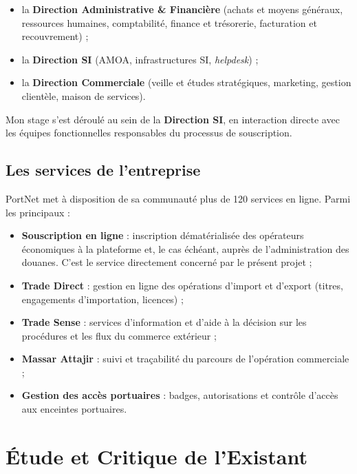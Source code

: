 \begin{itemize}[leftmargin=1.6cm,itemsep=2pt,topsep=4pt]
  \item la \textbf{Direction Administrative \& Financière} (achats et moyens
        généraux, ressources humaines, comptabilité, finance et trésorerie,
        facturation et recouvrement) ;
  \item la \textbf{Direction SI} (AMOA, infrastructures SI, \textit{helpdesk}) ;
  \item la \textbf{Direction Commerciale} (veille et études stratégiques,
        marketing, gestion clientèle, maison de services).
\end{itemize}

Mon stage s'est déroulé au sein de la \textbf{Direction SI}, en interaction
directe avec les équipes fonctionnelles responsables du processus de souscription.

\subsection{Les services de l'entreprise}

PortNet met à disposition de sa communauté plus de 120 services en ligne. Parmi
les principaux :

\begin{itemize}[leftmargin=1.6cm,itemsep=3pt,topsep=4pt]
  \item \textbf{Souscription en ligne} : inscription dématérialisée des opérateurs
        économiques à la plateforme et, le cas échéant, auprès de l'administration
        des douanes. C'est le service directement concerné par le présent projet ;
  \item \textbf{Trade Direct} : gestion en ligne des opérations d'import et
        d'export (titres, engagements d'importation, licences) ;
  \item \textbf{Trade Sense} : services d'information et d'aide à la décision sur
        les procédures et les flux du commerce extérieur ;
  \item \textbf{Massar Attajir} : suivi et traçabilité du parcours de l'opération
        commerciale ;
  \item \textbf{Gestion des accès portuaires} : badges, autorisations et contrôle
        d'accès aux enceintes portuaires.
\end{itemize}

\section{\'{E}tude et Critique de l'Existant}

